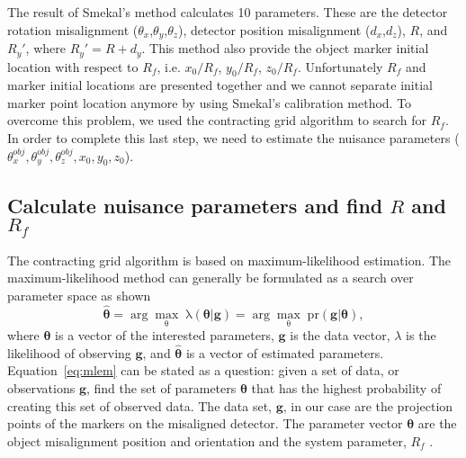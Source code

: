 The result of Smekal's method calculates 10 parameters.  These are the detector rotation misalignment ($\theta_x$,$\theta_y$,$\theta_z$), detector position misalignment ($d_x$,$d_z$), $R$, and $R_y'$, where $R_y' = R + d_y$.  This method also provide the object marker initial location with respect to $R_f$, i.e. $x_0/R_f$, $y_0/R_f$, $z_0/R_f$.  Unfortunately $R_f$ and marker initial locations are presented together and we cannot separate initial marker point location anymore by using Smekal's calibration method.  To overcome this problem, we used the contracting grid algorithm to search for $R_f$.  In order to complete this last step, we need to estimate the nuisance parameters ($\theta_x^{obj}, \theta_y^{obj}, \theta_z^{obj}, x_0, y_0, z_0$).


\subsection{Calculate nuisance parameters and find $R$ and $R_f$}
The contracting grid algorithm is based on maximum-likelihood estimation.  The maximum-likelihood method can generally be formulated as a search over parameter space as shown 
\begin{equation}
\label{eq:mlem}
\mathrm{\hat{\boldsymbol{\theta}} = \arg\max_{\theta} \; \lambda (\boldsymbol{\theta}| \boldsymbol{g}) = \arg\max_{\theta} \; pr( \boldsymbol{g}|\boldsymbol{\theta} )},
\end{equation}
where $\boldsymbol{\theta}$ is a vector of the interested parameters, $\boldsymbol{g}$ is the data vector, $\lambda$ is the likelihood of observing $\boldsymbol{g}$, and $\hat{\boldsymbol{\theta}}$ is a vector of estimated parameters. 
Equation~\ref{eq:mlem} can be stated as a question: given a set of data, or observations $\boldsymbol{g}$, find the set of parameters $\boldsymbol{\theta}$ that has the highest probability of creating this set of observed data.  The data set, $\boldsymbol{g}$, in our case are the projection points of the markers on the misaligned detector. The parameter vector $\boldsymbol{\theta}$ are the object misalignment position and orientation and the system parameter, $R_f$ .  

